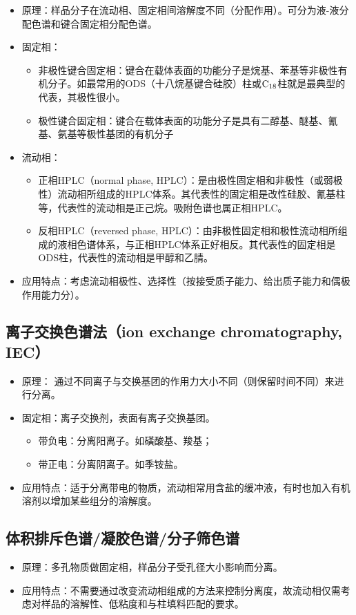 \begin{itemize}
	\item 原理：样品分子在流动相、固定相间溶解度不同（分配作用）。可分为液-液分配色谱和键合固定相分配色谱。
	\item 固定相：
	\begin{itemize}
		\item 非极性键合固定相：键合在载体表面的功能分子是烷基、苯基等非极性有机分子。如最常用的ODS（十八烷基键合硅胶）柱或$\ce{C18}$柱就是最典型的代表，其极性很小。
		\item 极性键合固定相：键合在载体表面的功能分子是具有二醇基、醚基、氰基、氨基等极性基团的有机分子
	\end{itemize}
	\item 流动相：
	\begin{itemize}
		\item 正相HPLC（normal  phase, HPLC）：是由极性固定相和非极性（或弱极性）流动相所组成的HPLC体系。其代表性的固定相是改性硅胶、氰基柱等，代表性的流动相是正己烷。吸附色谱也属正相HPLC。
		\item 反相HPLC（reversed phase, HPLC）：由非极性固定相和极性流动相所组成的液相色谱体系，与正相HPLC体系正好相反。其代表性的固定相是ODS柱，代表性的流动相是甲醇和乙腈。
	\end{itemize}
	\item 应用特点：考虑流动相极性、选择性（按接受质子能力、给出质子能力和偶极作用能力分）。
\end{itemize}

\subsection{离子交换色谱法（ion exchange chromatography, IEC）}
\begin{itemize}
	\item 原理： 通过不同离子与交换基团的作用力大小不同（则保留时间不同）来进行分离。
	\item 固定相：离子交换剂，表面有离子交换基团。
	\begin{itemize}
		\item 带负电：分离阳离子。如磺酸基、羧基；
		\item 带正电：分离阴离子。如季铵盐。
	\end{itemize}
	\item 应用特点：适于分离带电的物质，流动相常用含盐的缓冲液，有时也加入有机溶剂以增加某些组分的溶解度。
\end{itemize}

\subsection{体积排斥色谱/凝胶色谱/分子筛色谱}
\begin{itemize}
	\item 原理：多孔物质做固定相，样品分子受孔径大小影响而分离。
	\item 应用特点：不需要通过改变流动相组成的方法来控制分离度，故流动相仅需考虑对样品的溶解性、低粘度和与柱填料匹配的要求。
\end{itemize}

